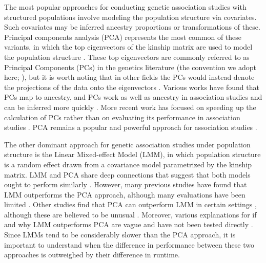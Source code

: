 \documentclass[11pt]{article}
\begin{document}
The most popular approaches for conducting genetic association studies with structured populations involve modeling the population structure via covariates.
Such covariates may be inferred ancestry proportions \citep{pritchard_association_2000} or transformations of these.
Principal components analysis (PCA) represents the most common of these variants, in which the top eigenvectors of the kinship matrix are used to model the population structure \citep{zhang_semiparametric_2003, price_principal_2006, bouaziz_accounting_2011}.
These top eigenvectors are commonly referred to as Principal Components (PCs) in the genetics literature (the convention we adopt here; \cite{patterson_population_2006}), but it is worth noting that in other fields the PCs would instead denote the projections of the data onto the eigenvectors \citep{jolliffe_principal_2002}.
Various works have found that PCs map to ancestry, and PCs work as well as ancestry in association studies and can be inferred more quickly \citep{patterson_population_2006, zhao_arabidopsis_2007, bouaziz_accounting_2011}.
More recent work has focused on speeding up the calculation of PCs rather than on evaluating its performance in association studies \citep{lee_sparse_2012, abraham_fast_2014, galinsky_fast_2016, abraham_flashpca2:_2017}.
PCA remains a popular and powerful approach for association studies \citep{wojcik_genetic_2019}.

The other dominant approach for genetic association studies under population structure is the Linear Mixed-effect Model (LMM), in which population structure is a random effect drawn from a covariance model parametrized by the kinship matrix.
LMM and PCA share deep connections that suggest that both models ought to perform similarly \citep{astle_population_2009, janss_inferences_2012, hoffman_correcting_2013}.
However, many previous studies have found that LMM outperforms the PCA approach, although many evaluations have been limited \citep{zhao_arabidopsis_2007, astle_population_2009, kang_variance_2010}.
Other studies find that PCA can outperform LMM in certain settings \citep{price_new_2010, wu_comparison_2011, wang_analytical_2013}, although these are believed to be unusual \citep{sul_mixed_2013}.
Moreover, various explanations for if and why LMM outperforms PCA are vague and have not been tested directly \citep{price_new_2010, sul_mixed_2013, price_response_2013, hoffman_correcting_2013}.
Since LMMs tend to be considerably slower than the PCA approach, it is important to understand when the difference in performance between these two approaches is outweighed by their difference in runtime.
\end{document}
